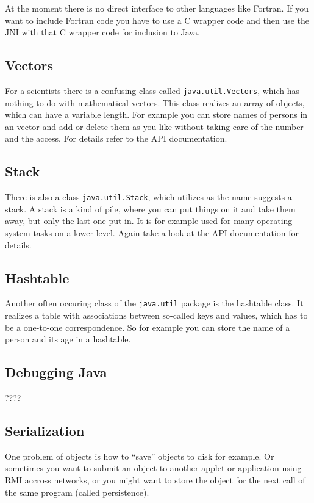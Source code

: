 At the moment there is no direct interface to other languages like
Fortran. If you want to include Fortran code you have to use
a C wrapper code and then use the JNI with that C wrapper code
for inclusion to Java.

\subsection{Vectors}
For a scientists there is a confusing class called \verb|java.util.Vectors|, 
which has nothing to do with mathematical vectors. This class realizes
an array of objects, which can have a variable length. For example
you can store names of persons in an vector and add or delete them as
you like without taking care of the number and the access. For details
refer to the API documentation.

\subsection{Stack}
There is also a class \verb|java.util.Stack|, which utilizes as the
name suggests a stack. A stack is a kind of pile, where you can put
things on it and take them away, but only the last one put in. It is
for example used for many operating system tasks on a lower level.
Again take a look at the API documentation for details.

\subsection{Hashtable}
Another often occuring class of the \verb|java.util| package is the
hashtable class. It realizes a table with associations between so-called
keys and values, which has to be a one-to-one correspondence. So for
example you can store the name of a person and its age in a hashtable.


\subsection{Debugging Java}
????

\subsection{Serialization}
One problem of objects is how to ``save'' objects to disk for example.
Or sometimes you want to submit an object to another applet or
application using RMI accross networks, or you might want to
store the object for the next call of the same program (called 
persistence). 

